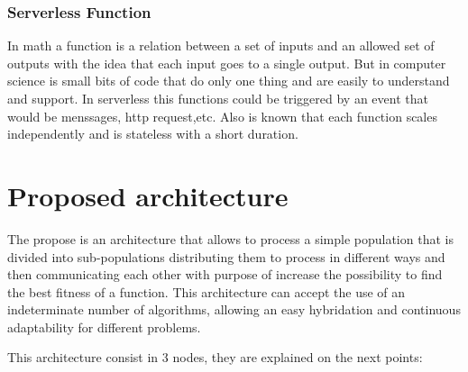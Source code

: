 \documentclass[runningheads]{llncs}
\begin{document}
\subsubsection{Serverless Function} 
In math a function is a relation between a set of inputs and an allowed set of
outputs with the idea that each input goes to a single output. But in computer
science is small bits of code that do only one thing and are easily to
understand and support. In serverless this functions could be triggered by an
event that would be menssages, http request,etc. Also is known that each
function scales independently and is stateless with a short duration.


\section{Proposed architecture}

The propose is an architecture that allows to process a simple population that
is divided into sub-populations distributing them to process in different ways
and then communicating each other with purpose of increase the possibility to
find the best fitness of a function. This architecture can accept the use of an
indeterminate number of algorithms, allowing an easy hybridation and continuous
adaptability for different problems.

This architecture consist in 3 nodes, they are explained on the next points:
\end{document}
